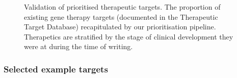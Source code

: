 \documentclass[
]{agujournal2019}
\begin{document}
\label{cell-fig-therapy-validate}
\begin{figure}[H]


\caption{\label{fig-therapy-validate}Validation of prioritised
therapeutic targets. The proportion of existing gene therapy targets
(documented in the Therapeutic Target Database) recapitulated by our
prioritisation pipeline. Therapetics are stratified by the stage of
clinical development they were at during the time of writing.}

\end{figure}%

\subsubsection{Selected example targets}\label{selected-example-targets}
\end{document}
